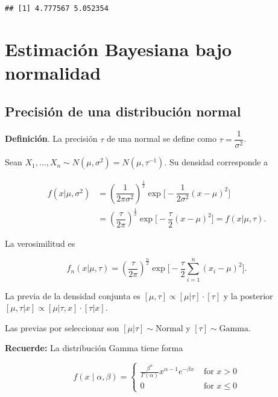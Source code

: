 \documentclass[
  12pt,
]{book}
\begin{document}
\begin{verbatim}
## [1] 4.777567 5.052354
\end{verbatim}

\hypertarget{estimaciuxf3n-bayesiana-bajo-normalidad}{%
\chapter{Estimación Bayesiana bajo normalidad}\label{estimaciuxf3n-bayesiana-bajo-normalidad}}

\hypertarget{precisiuxf3n-de-una-distribuciuxf3n-normal}{%
\section{Precisión de una distribución normal}\label{precisiuxf3n-de-una-distribuciuxf3n-normal}}

\textbf{Definición}. La precisión \(\tau\) de una normal se define como \(\tau = \dfrac 1{\sigma^2}\).

Sean \(X_1,\dots,X_n\sim N(\mu,\sigma^2) = N(\mu,\tau ^{-1})\). Su densidad corresponde a

\begin{align*}
f(x|\mu,\sigma^2) 
&= \left(\dfrac 1{2\pi\sigma^2}\right)^{\frac12}\exp\bigg[-\dfrac1{2\sigma^2}(x-\mu)^2\bigg] \\
&= \left(\dfrac \tau{2\pi}\right)^{\frac12}\exp\bigg[-\dfrac\tau{2}(x-\mu)^2\bigg]=f(x|\mu,\tau).
\end{align*}

La verosimilitud es

\[f_n(x|\mu,\tau) = \left(\dfrac\tau{2\pi}\right)^{\frac n2}\exp\bigg[-\dfrac\tau2\sum_{i=1}^n(x_i-\mu)^2
\bigg].\]

La previa de la densidad conjunta es \([\mu,\tau]\propto [\mu|\tau]\cdot [\tau]\) y la posterior \([\mu,\tau|x] \propto [\mu|\tau,x]\cdot[\tau|x]\).

Las previas por seleccionar son \([\mu|\tau]\sim \text{Normal}\) y \([\tau]\sim\text{Gamma}\).

\textbf{Recuerde:} La distribución Gamma tiene forma

\begin{equation*}f(x \mid \alpha, \beta)=\left\{\begin{array}{ll}
\frac{\beta^{\alpha}}{\Gamma(\alpha)} x^{\alpha-1} e^{-\beta x} & \text { for } x>0 \\
0 & \text { for } x \leq 0
\end{array}\right.\end{equation*}
\end{document}

